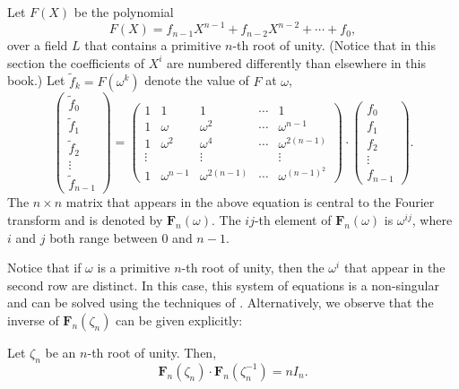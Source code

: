 Let $F(X)$ be the polynomial
\[
F(X) = f_{n-1} X^{n-1} + f_{n-2} X^{n-2} + \cdots + f_0,
\] 
over a field $L$ that contains a primitive $n$-th root
of unity.  (Notice that in this section the coefficients of $X^i$ are
numbered differently than elsewhere in this book.)  Let $\tilde{f}_k
= F(\omega^k)$ denote the value of $F$ at $\omega$, \ie
\[
\left(\begin{array}{c}
\tilde{f}_0 \\ \tilde{f}_1 \\ \tilde{f}_2 \\ \vdots \\ \tilde{f}_{n-1}
\end{array}\right) =
\left(\begin{array}{ccccc}
1 &       1 &         1 & \cdots & 1 \\
1 & \omega & \omega^2 & \cdots & \omega^{n-1} \\
1 & \omega^2 & \omega^4 & \cdots & \omega^{2(n-1)} \\
\vdots & & \vdots & & \vdots \\
1 & \omega^{n-1} & \omega^{2(n-1)} & \cdots & \omega^{(n-1)^2} 
\end{array}\right)
\cdot
\left(\begin{array}{c}
f_0 \\ f_1 \\ f_2 \\ \vdots \\ f_{n-1}
\end{array}\right).
\]
The $n\times n$ matrix that appears in the above equation is central
to the Fourier transform and is denoted by $\mathbf{F}_n(\omega)$.  The
$ij$-th element of $\mathbf{F}_n(\omega)$ is $\omega^{ij}$, where $i$
and $j$ both range between $0$ and $n-1$.

Notice that if $\omega$ is a primitive $n$-th root of
unity, then the $\omega^i$ that appear
in the second row are distinct.  In this case, this system of
equations is a non-singular  and can be solved
using the techniques of .  Alternatively, we
observe that the inverse of $\mathbf{F}_n(\zeta_n)$ can be given
explicitly:

\begin{proposition}\label{Fourier:Matrix:Prop}
Let $\zeta_n$ be an $n$-th root of unity.  Then,
\[
\mathbf{F}_n(\zeta_n) \cdot \mathbf{F}_n(\zeta_n^{-1}) = n I_n.
\]
\end{proposition}

